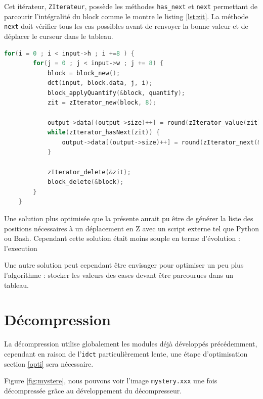 \documentclass[a4paper, 11pt]{article}
\begin{document}
	Cet itérateur, \texttt{ZIterateur}, possède les méthodes \texttt{has\_next} et \texttt{next} permettant de parcourir l'intégralité du block comme le montre
	le listing \ref{lst:zit}. La méthode
	\texttt{next} doit vérifier tous les cas possibles avant de renvoyer la bonne valeur et de déplacer le curseur dans le tableau. 
	\begin{lstlisting}[language=C, caption=Vectoriser une image, label=lst:zit]
	for(i = 0 ; i < input->h ; i +=8 ) {
		for(j = 0 ; j < input->w ; j += 8) {
			block = block_new();
			dct(input, block.data, j, i);
			block_applyQuantify(&block, quantify);
			zit = zIterator_new(block, 8);

			output->data[(output->size)++] = round(zIterator_value(zit)); 
			while(zIterator_hasNext(zit)) {
				output->data[(output->size)++] = round(zIterator_next(&zit));
			}

			zIterator_delete(&zit);
			block_delete(&block);
		}
	}
			\end{lstlisting}	
	Une solution plus optimisée que la présente aurait pu être de générer la liste des positions nécessaires à un déplacement en Z avec un script externe tel que
	Python ou Bash. Cependant cette solution était moins souple en terme d'évolution : l'execution 

	Une autre solution peut cependant être envisager pour optimiser un peu plus l'algorithme : stocker les valeurs des cases devant être parcourues dans un
	tableau.

	\section{Décompression}
	La décompression utilise globalement les modules déjà développés précédemment, cependant en raison de l'\texttt{idct} particulièrement lente, une étape d'optimisation
	section \ref{opti} sera nécessaire.

	Figure \ref{fig:mystere}, nous pouvons voir l'image \texttt{mystery.xxx} une fois décompressée grâce au développement du décompresseur.
\end{document}
